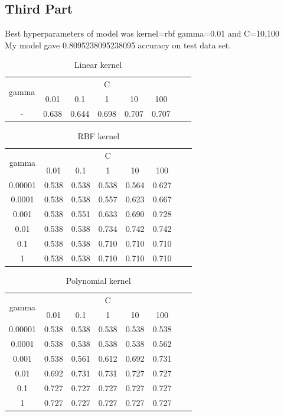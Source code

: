 \documentclass{article}
\begin{document}
\subsection{Third Part}
Best hyperparameters of model was kernel=rbf gamma=0.01 and C=10,100\\
My model gave 0.8095238095238095 accuracy on test data set.
\begin{table}[h]
    \centering
    \begin{tabular}{|c|c|c|c|c|c|c|c|}
    \hline
    \multirow{2}{5em}{gamma} & \multicolumn{5}{c|}{C} \\
        & 0.01 & 0.1 & 1 & 10 & 100 \\
        \hline \hline
        -  & 0.638 & 0.644 & 0.698 & 0.707 & 0.707 \\
        \hline
    \end{tabular}
    \caption{Linear kernel}
    \label{tab:linear}
\end{table}

\begin{table}[h]
    \centering
    \begin{tabular}{|c|c|c|c|c|c|c|c|}
    \hline
    \multirow{2}{5em}{gamma} & \multicolumn{5}{c|}{C} \\
        & 0.01 & 0.1 & 1 & 10 & 100 \\
        \hline \hline
        0.00001  & 0.538 & 0.538 & 0.538 & 0.564 & 0.627 \\
        0.0001  & 0.538 & 0.538 & 0.557 & 0.623 & 0.667 \\
        0.001  & 0.538 & 0.551 & 0.633 & 0.690 & 0.728 \\
        0.01  & 0.538 & 0.538 & 0.734 & 0.742 & 0.742 \\
        0.1  & 0.538 & 0.538 & 0.710 & 0.710 & 0.710 \\
        1  & 0.538 & 0.538 & 0.710 & 0.710 & 0.710 \\
        \hline
    \end{tabular}
    \caption{RBF kernel}
    \label{tab:rbf}
\end{table}

\begin{table}[h]
    \centering
    \begin{tabular}{|c|c|c|c|c|c|c|c|}
    \hline
    \multirow{2}{5em}{gamma} & \multicolumn{5}{c|}{C} \\
        & 0.01 & 0.1 & 1 & 10 & 100 \\
        \hline \hline
        0.00001  & 0.538 & 0.538 & 0.538 & 0.538 & 0.538 \\
        0.0001  & 0.538 & 0.538 & 0.538 & 0.538 & 0.562 \\
        0.001  & 0.538 & 0.561 & 0.612 & 0.692 & 0.731 \\
        0.01  & 0.692 & 0.731 & 0.731 & 0.727 & 0.727 \\
        0.1  & 0.727 & 0.727 & 0.727 & 0.727 & 0.727 \\
        1  & 0.727 & 0.727 & 0.727 & 0.727 & 0.727 \\
        \hline
    \end{tabular}
    \caption{Polynomial kernel}
    \label{tab:poly}
\end{table}
\end{document}
